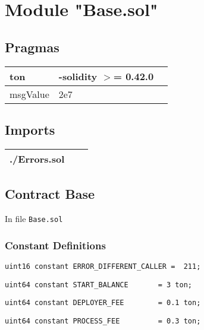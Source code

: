 
\section{Module "Base.sol"}


\subsection{Pragmas}


\noindent\begin{tabular}{|l|l|p{5cm}|}\hline
ton & -solidity $>$= 0.42.0 &\\\hline
msgValue &  2e7 &\\\hline
\end{tabular}


\subsection{Imports}


\noindent\begin{tabular}{|l|l|p{5cm}|}\hline
./Errors.sol &\\\hline
\end{tabular}


\subsection{Contract Base}

\minitoc

In file {\tt Base.sol}

\subsubsection{Constant Definitions}


\begin{lstlisting}[firstnumber=8]
    uint16 constant ERROR_DIFFERENT_CALLER =  211;
\end{lstlisting}

\begin{lstlisting}[firstnumber=10]
    uint64 constant START_BALANCE       = 3 ton;
\end{lstlisting}

\begin{lstlisting}[firstnumber=11]
    uint64 constant DEPLOYER_FEE        = 0.1 ton;
\end{lstlisting}

\begin{lstlisting}[firstnumber=12]
    uint64 constant PROCESS_FEE         = 0.3 ton;
\end{lstlisting}


